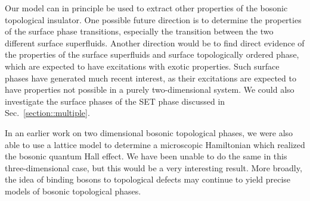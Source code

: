 \documentclass[prb,twocolumn]{revtex4-1}
\begin{document}
Our model can in principle be used to extract other properties of the bosonic topological insulator. One possible future direction is to determine the properties of the surface phase transitions, especially the transition between the two different surface superfluids. Another direction would be to find direct evidence of the properties of the surface superfluids and surface topologically ordered phase, which are expected to have excitations with exotic properties. Such surface phases have generated much recent interest, as their excitations are expected to have properties not possible in a purely two-dimensional system.\cite{SenthilVishwanath,Chen2014,Cho2014} We could also investigate the surface phases of the SET phase discussed in Sec.~\ref{section::multiple}.


In an earlier work on two dimensional bosonic topological phases,\cite{FQHE} we were also able to use a lattice model to determine a microscopic Hamiltonian which realized the bosonic quantum Hall effect. We have been unable to do the same in this three-dimensional case, but this would be a very interesting result. More broadly, the idea of binding bosons to topological defects may continue to yield precise models of bosonic topological phases.


\end{document}
